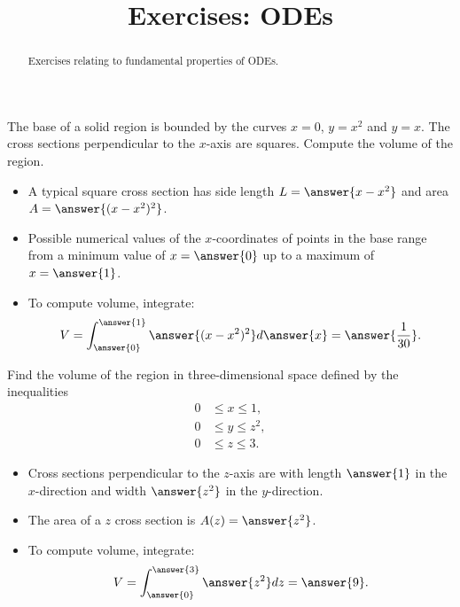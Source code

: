 \documentclass{ximera}
\title{Exercises: ODEs}
\begin{document}
\begin{abstract}
Exercises relating to fundamental properties of ODEs.
\end{abstract}
\maketitle

\begin{exercise}
The base of a solid region is bounded by the curves $x = 0$, $y = x^2$ and $y = x$. The cross sections perpendicular to the $x$-axis are squares. Compute the volume of the region.
\begin{itemize}
\item A typical square cross section has side length $L = \answer{x - x^2}$ and area $A = \answer{(x-x^2)^2}$. 
\item Possible numerical values of the $x$-coordinates of points in the base range from a minimum value of $x = \answer{0}$ up to a maximum of $x = \answer{1}$.
\item To compute volume, integrate:
\[ V = \int_{\answer{0}}^{\answer{1}} \answer{(x-x^2)^2} d\answer{x} = \answer{\frac{1}{30}}. \]
\end{itemize}
\end{exercise}

\begin{exercise}
Find the volume of the region in three-dimensional space defined by the inequalities
\begin{align*}
0 & \leq x \leq 1, \\
0 & \leq y \leq z^2, \\
0 & \leq z \leq 3.
\end{align*}
\begin{itemize}
\item Cross sections perpendicular to the $z$-axis are  with length $\answer{1}$ in the $x$-direction and width $\answer{z^2}$ in the $y$-direction.
\item The area of a $z$ cross section is $A(z) = \answer{z^2}$.
\item To compute volume, integrate:
\[ V = \int_{\answer{0}}^{\answer{3}} \answer{z^2} dz = \answer{9}. \]
\end{itemize}
\end{exercise}
\end{document}

